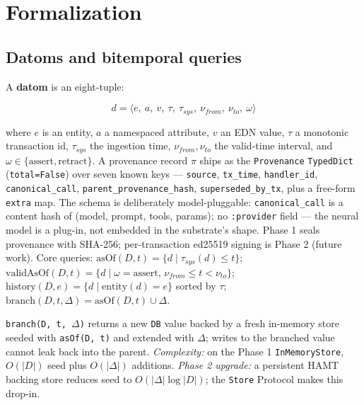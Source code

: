 \documentclass[anon]{nesy2026}   %
\newcommand{\C}[1]{\texttt{#1}}
\begin{document}
\section{Formalization}\label{sec:formal}

\subsection{Datoms and bitemporal queries}\label{sec:datoms}

A \textbf{datom} is an eight-tuple:

\begin{equation}\label{eq:datom}
d = \langle e,\ a,\ v,\ \tau,\ \tau_{sys},\ \nu_{from},\ \nu_{to},\ \omega \rangle
\end{equation}

where $e$ is an entity, $a$ a namespaced attribute, $v$ an EDN value, $\tau$ a monotonic transaction id, $\tau_{sys}$ the ingestion time, $\nu_{from},\nu_{to}$ the valid-time interval, and $\omega \in \{\text{assert}, \text{retract}\}$. A provenance record $\pi$ ships as the \C{Provenance} \C{TypedDict} (\C{total=False}) over seven known keys --- \C{source}, \C{tx\_time}, \C{handler\_id}, \C{canonical\_call}, \C{parent\_provenance\_hash}, \C{superseded\_by\_tx}, plus a free-form \C{extra} map. The schema is deliberately model-pluggable: \C{canonical\_call} is a content hash of (model, prompt, tools, params); no \C{:provider} field --- the neural model is a plug-in, not embedded in the substrate's shape. Phase 1 seals provenance with SHA-256; per-transaction ed25519 signing is Phase 2 (future work). Core queries: $\text{asOf}(D, t) = \{d \mid \tau_{sys}(d) \leq t\}$; $\text{validAsOf}(D, t) = \{d \mid \omega = \text{assert},\, \nu_{from} \leq t < \nu_{to}\}$; $\text{history}(D, e) = \{d \mid \text{entity}(d) = e\}$ sorted by $\tau$; $\text{branch}(D, t, \Delta) = \text{asOf}(D, t) \cup \Delta$.

\begin{proposition}\label{prop:branch}
\C{branch(D, t, $\Delta$)} returns a new \C{DB} value backed by a fresh in-memory store seeded with \C{asOf(D, t)} and extended with $\Delta$; writes to the branched value cannot leak back into the parent. \emph{Complexity:} on the Phase 1 \C{InMemoryStore}, $O(|D|)$ seed plus $O(|\Delta|)$ additions. \emph{Phase 2 upgrade:} a persistent HAMT backing store reduces seed to $O(|\Delta| \log |D|)$; the \C{Store} Protocol makes this drop-in.
\end{proposition}
\end{document}
